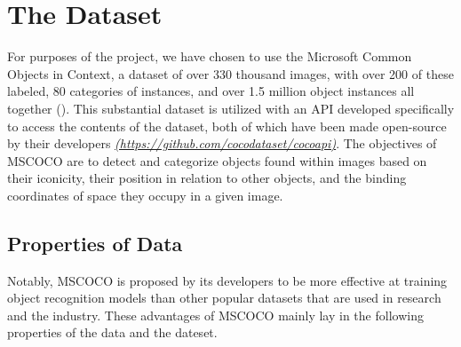 \section{The Dataset}

For purposes of the project, we have chosen to use the Microsoft Common Objects in Context, a dataset of over 330 thousand images, with over 200 of these labeled, 80 categories of instances, and over 1.5 million object instances all together (). This substantial dataset is utilized with an API developed specifically to access the contents of the dataset, both of which have been made open-source by their developers \textit{\href{https://github.com/cocodataset/cocoapi}{(https://github.com/cocodataset/cocoapi)}}. The objectives of MSCOCO are to detect and categorize objects found within images based on their iconicity, their position in relation to other objects, and the binding coordinates of space they occupy in a given image. 


\subsection{Properties of Data}
Notably, MSCOCO is proposed by its developers to be more effective at training object recognition models than other popular datasets that are used in research and the industry. These advantages of MSCOCO mainly lay in the following properties of the data and the dateset.


